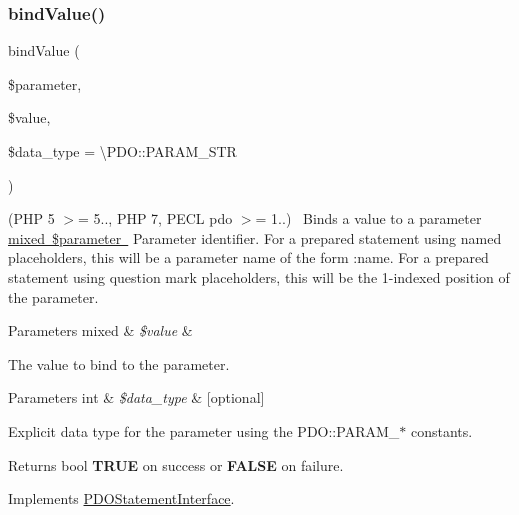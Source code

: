 \subsubsection{\texorpdfstring{bind\+Value()}{bindValue()}}
{\footnotesize\ttfamily bind\+Value (\begin{DoxyParamCaption}\item[{}]{\$parameter,  }\item[{}]{\$value,  }\item[{}]{\$data\+\_\+type = {\ttfamily \textbackslash{}PDO\+:\+:PARAM\+\_\+STR} }\end{DoxyParamCaption})}

(P\+HP 5 $>$= 5.., P\+HP 7, P\+E\+CL pdo $>$= 1..)~\newline
 Binds a value to a parameter \mbox{\hyperlink{}{mixed \$parameter }} Parameter identifier. For a prepared statement using named placeholders, this will be a parameter name of the form \+:name. For a prepared statement using question mark placeholders, this will be the 1-\/indexed position of the parameter. 


\begin{DoxyParams}[1]{Parameters}
mixed & {\em \$value} & \\
\hline
\end{DoxyParams}
The value to bind to the parameter. 


\begin{DoxyParams}[1]{Parameters}
int & {\em \$data\+\_\+type} & \mbox{[}optional\mbox{]} \\
\hline
\end{DoxyParams}
Explicit data type for the parameter using the P\+D\+O\+::\+P\+A\+R\+A\+M\+\_\+$\ast$ constants. 

\begin{DoxyReturn}{Returns}
bool {\bfseries T\+R\+UE} on success or {\bfseries F\+A\+L\+SE} on failure. 
\end{DoxyReturn}


Implements \mbox{\hyperlink{interface_pes_1_1_database_1_1_statement_1_1_p_d_o_statement_interface_ab9f2884830bd9b2063f3422be69015dd}{P\+D\+O\+Statement\+Interface}}.

\mbox{\label{class_pes_1_1_database_1_1_statement_1_1_statement_addad8fb3f107b88d79d94550582a4355}} 
